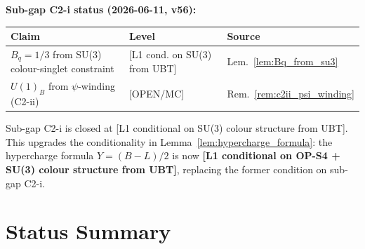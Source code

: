 \documentclass[12pt,a4paper]{article}
\theoremstyle{definition}
\theoremstyle{remark}
\begin{document}
\begin{resultbox}
  \textbf{Sub-gap C2-i status (2026-06-11, v56):}

  \begin{center}
  \begin{tabular}{lll}
    \toprule
    \textbf{Claim} & \textbf{Level} & \textbf{Source} \\
    \midrule
    $B_q=1/3$ from SU(3) colour-singlet constraint & [L1 cond. on SU(3) from UBT] & Lem.~\ref{lem:Bq_from_su3} \\
    $U(1)_B$ from $\psi$-winding (C2-ii) & [OPEN/MC] & Rem.~\ref{rem:c2ii_psi_winding} \\
    \bottomrule
  \end{tabular}
  \end{center}

  Sub-gap C2-i is closed at [L1 conditional on SU(3) colour structure from UBT].
  This upgrades the conditionality in Lemma~\ref{lem:hypercharge_formula}:
  the hypercharge formula $Y=(B{-}L)/2$ is now
  \textbf{[L1 conditional on OP-S4 + SU(3) colour structure from UBT]},
  replacing the former condition on sub-gap C2-i.
\end{resultbox}

\section{Status Summary}
\label{sec:status}
\end{document}
